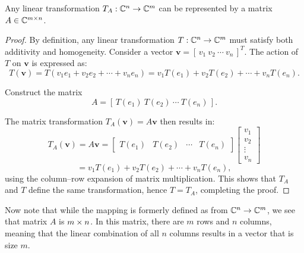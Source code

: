 \documentclass[12pt]{article}
\begin{document}
\begin{theorem}
    Any linear transformation $T_A: \mathbb{C}^n \rightarrow \mathbb{C}^m$ can be represented by a matrix $A \in \mathbb{C}^{m \times n}$.
\end{theorem}

\begin{proof}
By definition, any linear transformation \(T : \mathbb{C}^{n} \to \mathbb{C}^{m}\) must satisfy both additivity and homogeneity. Consider a vector \(\mathbf{v} = [\,v_{1}\ v_{2}\ \cdots\ v_{n}\,]^{T}\). The action of \(T\) on \(\mathbf{v}\) is expressed as:
\[
T(\mathbf{v}) = T(v_{1} e_{1} + v_{2} e_{2} + \cdots + v_{n} e_{n}) = v_{1} T(e_{1}) + v_{2} T(e_{2}) + \cdots + v_{n} T(e_{n}).
\]

Construct the matrix
\[
A = [\,T(e_{1}) \ T(e_{2}) \ \cdots \ T(e_{n})\,].
\]

The matrix transformation \(T_{A}(\mathbf{v}) = A \mathbf{v}\) then results in:
\[
T_{A}(\mathbf{v}) = A \mathbf{v} = 
\begin{bmatrix}
T(e_{1}) & T(e_{2}) & \cdots & T(e_{n})
\end{bmatrix}
\begin{bmatrix}
v_{1} \\
v_{2} \\
\vdots \\
v_{n}
\end{bmatrix}
\]
\[
= v_{1} T(e_{1}) + v_{2} T(e_{2}) + \cdots + v_{n} T(e_{n}),
\]
using the column–row expansion of matrix multiplication. This shows that \(T_{A}\) and \(T\) define the same transformation, hence \(T = T_{A}\), completing the proof.
\end{proof}


Now note that while the mapping is formerly defined as from $\mathbb{C}^n \rightarrow \mathbb{C}^m$, we see that matrix $A$ is ${m \times n}$. In this matrix, there are $m$ rows and $n$ columns, meaning that the linear combination of all $n$ columns results in a vector that is size $m$. 
\end{document}
